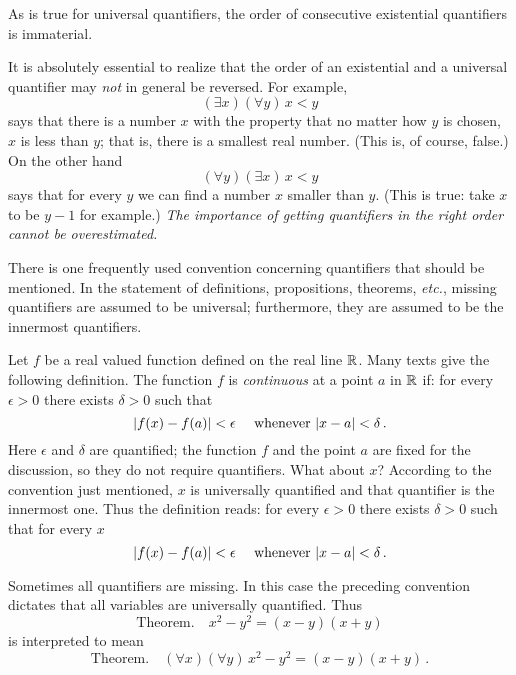 As is true for universal quantifiers, the order of consecutive existential quantifiers is
immaterial.

\begin{cau}  It is absolutely essential to realize that the order of an existential and a
universal quantifier may \emph{not} in general be reversed. For example,
  \[ (\exists x)(\forall y)\, x < y \]
says that there is a number $x$ with the property that no matter how $y$ is chosen, $x$ is
less than $y$; that is, there is a smallest real number. (This is, of course, false.) On the
other hand
  \[ (\forall y)(\exists x)\, x < y \]
says that for every $y$ we can find a number $x$ smaller than $y$.  (This is true: take $x$ to
be $y - 1$ for example.) \emph{The importance of getting quantifiers in the right order cannot
be overestimated.}
\end{cau}

There is one frequently used convention concerning quantifiers that should be mentioned.  In
the statement of definitions, propositions, theorems, \emph{etc.}, missing quantifiers are
assumed to be universal; furthermore, they are assumed to be the innermost quantifiers.

\begin{exam}  Let $f$ be a real valued function defined on the real line $\mathbb{R}$.  Many texts give
the following definition. The function $f$ is \emph{continuous} at a point $a$ in $\mathbb{R}$ if: for
every $\epsilon > 0$ there exists $\delta > 0$ such that
  \[\lvert f(x) - f(a)\rvert < \epsilon \quad\text{ whenever } \lvert x - a\rvert < \delta\,. \]
Here $\epsilon$ and $\delta$ are quantified; the function $f$ and the point $a$ are fixed for
the discussion, so they do not require quantifiers. What about $x$?  According to the
convention just mentioned, $x$ is universally quantified and that quantifier is the innermost
one. Thus the definition reads: for every $\epsilon > 0$ there exists $\delta > 0$ such that
for every $x$
  \[\lvert f(x) - f(a)\rvert < \epsilon \quad\text{ whenever } \lvert x - a\rvert < \delta\,. \]
\end{exam}


\begin{exam}Sometimes all quantifiers are missing.  In this case the preceding convention dictates
that all variables are universally quantified. Thus
  \[ \text{Theorem.}\quad  x^2 - y^2 = (x - y)(x + y) \]
is interpreted to mean
  \[\text{Theorem.}\quad  (\forall x)(\forall y)\, x^2 - y^2  = (x - y)(x+y)\,. \]
\end{exam}

